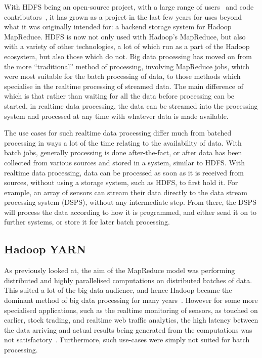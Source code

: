 With HDFS being an open-source project, with a large range of users~\cite{hadoop_users} and code
contributors~\cite{hadoop_committers}, it has grown as a project in the last few years for uses beyond what it was
originally intended for: a backend storage system for Hadoop MapReduce. HDFS is now not only used with Hadoop's
MapReduce, but also with a variety of other technologies, a lot of which run as a part of the Hadoop ecosystem, but
also those which do not.
Big data processing has moved on from the more ``traditional'' method of processing, involving MapReduce jobs, which
were most suitable for the batch processing of data, to those methods which specialise in the realtime processing of
streamed data.
The main difference of which is that rather than waiting for all the data before processing can be started, in realtime
data processing, the data can be streamed into the processing system and processed at any time with whatever data is
made available.

The use cases for such realtime data processing differ much from batched processing in ways a lot of the time relating
to the availability of data. With batch jobs, generally processing is done after-the-fact, or after data has been
collected from various sources and stored in a system, similar to HDFS. With realtime data processing, data can be
processed as soon as it is received from sources, without using a storage system, such as HDFS, to first hold it.
For example, an array of sensors can stream their data directly to the data stream processing system (DSPS), without
any intermediate step. From there, the DSPS will process the data according to how it is programmed, and either
send it on to further systems, or store it for later batch processing.


\subsection{Hadoop YARN} %
\label{ssub:apache_hadoop_yarn_}

As previously looked at, the aim of the MapReduce model was performing distributed and highly parallelised computations
on distributed batches of data. This suited a lot of the big data audience, and hence Hadoop became the dominant
method of big data processing for many years~\cite{liu_survey_2014}. However for some more specialised applications, such as
the realtime monitoring of sensors, as touched on earlier, stock trading, and realtime web traffic analytics, the high
latency between the data arriving and actual results being generated from the computations was not
satisfactory~\cite{kamburugamuve_survey_2014}. Furthermore, such use-cases were simply not suited for batch processing.

